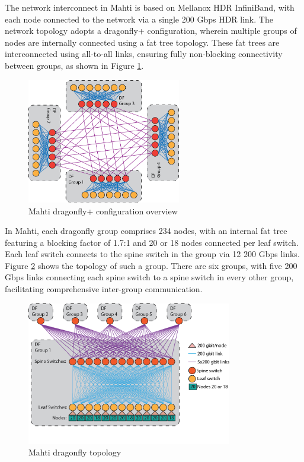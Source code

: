 The network interconnect in Mahti is based on Mellanox HDR InfiniBand, with each node connected to the network via a single 200 Gbps HDR link. The network topology adopts a dragonfly+ configuration, wherein multiple groups of nodes are internally connected using a fat tree topology. These fat trees are interconnected using all-to-all links, ensuring fully non-blocking connectivity between groups, as shown in Figure \ref{fig_mahti_df_ex}.

\begin{figure}[H]
    \centering
    \includegraphics[width=0.6\textwidth]{figures/mahti_df_ex.png}
    \caption{Mahti dragonfly+ configuration overview \cite{mahti}}
    \label{fig_mahti_df_ex}
\end{figure}

In Mahti, each dragonfly group comprises 234 nodes, with an internal fat tree featuring a blocking factor of 1.7:1 and 20 or 18 nodes connected per leaf switch. Each leaf switch connects to the spine switch in the group via 12 200 Gbps links. Figure \ref{fig_mahti_df} shows the topology of such a group. There are six groups, with five 200 Gbps links connecting each spine switch to a spine switch in every other group, facilitating comprehensive inter-group communication.

\begin{figure}[H]
    \centering
    \includegraphics[width=0.8\textwidth]{figures/mahti_df.png}
    \caption{Mahti dragonfly topology \cite{mahti}}
    \label{fig_mahti_df}
\end{figure}

